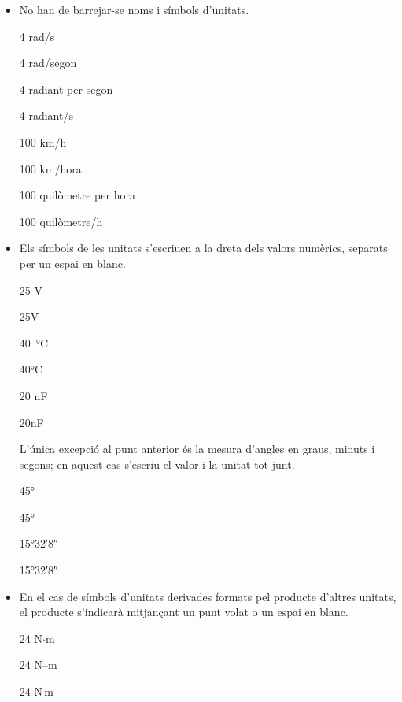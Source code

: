 \begin{itemize}
\item No han de barrejar-se noms i símbols d'unitats.

\textcolor{Green}\faCheckSquare{} 4 rad/s

\textcolor{Red}\faTimesCircle{} 4 rad/segon

\textcolor{Green}\faCheckSquare{} 4 radiant per segon

\textcolor{Red}\faTimesCircle{} 4 radiant/s

\textcolor{Green}\faCheckSquare{} 100 km/h

\textcolor{Red}\faTimesCircle{} 100 km/hora

\textcolor{Green}\faCheckSquare{} 100 quilòmetre per hora

\textcolor{Red}\faTimesCircle{} 100 quilòmetre/h


\item Els símbols de les unitats s'escriuen a la dreta dels valors
numèrics, separats per un espai en blanc.

\textcolor{Green}\faCheckSquare{} 25 V

\textcolor{Red}\faTimesCircle{} 25V

\textcolor{Green}\faCheckSquare{} \SI{40}{\degreeCelsius}

\textcolor{Red}\faTimesCircle{} 40\si{\degreeCelsius}

\textcolor{Green}\faCheckSquare{} 20 nF

\textcolor{Red}\faTimesCircle{} 20nF


 L'única excepció al punt anterior és la mesura d'angles en graus, minuts i segons; en aquest cas s'escriu el valor i la unitat tot junt.

\textcolor{Green}\faCheckSquare{} \ang{45}

\textcolor{Red}\faTimesCircle{} \ang[number-angle-product = \,]{45}

\textcolor{Green}\faCheckSquare{} \ang{15;32;8}

\textcolor{Red}\faTimesCircle{} \ang[number-angle-product = \,]{15;32;8}

\item En el cas de símbols d'unitats derivades formats pel producte
d'altres unitats, el producte s'indicarà mitjançant un punt volat o
un espai en blanc.

\textcolor{Green}\faCheckSquare{} 24 N$\cdot$m

\textcolor{Red}\faTimesCircle{} 24 N--m

\textcolor{Green}\faCheckSquare{} 24 N\,m


\end{itemize}
